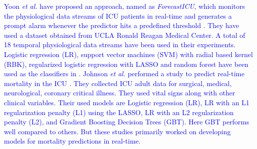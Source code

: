 \textcolor{blue}{Yoon \textit{et al.} have proposed an approach, named as \textit{ForecastICU}, which monitors the physiological data streams of ICU patients in real-time and generates a prompt alarm whenever the predictor hits a predefined threshold \cite{Yoon2016}. They have used a dataset obtained from UCLA Ronald Reagan Medical Center. A total of 18 temporal physiological data streams have been used in their experiments. Logistic regression (LR), support vector machines (SVM) with radial based kernel (RBK), regularized logistic regression with LASSO and random forest have been used as the classifiers in \cite{Yoon2016}. Johnson \textit{et al.} performed a study to predict real-time mortality in the ICU \cite{Johnson2017}. They collected ICU adult data for surgical, medical, neurological, coronary critical illness. They used vital signs along with other clinical variables. Their used models are Logistic regression (LR), LR with an L1 regularization penalty (L1) using the LASSO, LR with an L2 regularization penalty (L2), and Gradient Boosting Decision Trees (GBT). Here GBT performs well compared to others. But these studies primarily worked on developing models for mortality predictions in real-time}.  
 
